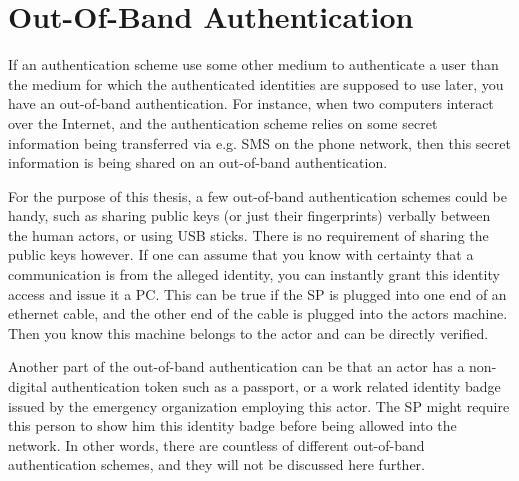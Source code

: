 \section{Out-Of-Band Authentication}
If an authentication scheme use some other medium to authenticate a user than
the medium for which the authenticated identities are supposed to use later, you
have an out-of-band authentication. For instance, when two computers interact
over the Internet, and the authentication scheme relies on some secret
information being transferred via e.g. SMS on the phone network, then this
secret information is being shared on an out-of-band authentication.

For the purpose of this thesis, a few out-of-band authentication schemes could
be handy, such as sharing public keys (or just their fingerprints) verbally
between the human actors, or using USB sticks. There is no requirement of
sharing the public keys however. If one can assume that you know with certainty
that a communication is from the alleged identity, you can instantly grant this
identity access and issue it a PC. This can be true if the SP is plugged into
one end of an ethernet cable, and the other end of the cable is plugged into the
actors machine. Then you know this machine belongs to the actor and can be
directly verified.

Another part of the out-of-band authentication can be that an actor has a
non-digital authentication token such as a passport, or a work related identity
badge issued by the emergency organization employing this actor. The SP might
require this person to show him this identity badge before being allowed into
the network. In other words, there are countless of different out-of-band
authentication schemes, and they will not be discussed here further.
